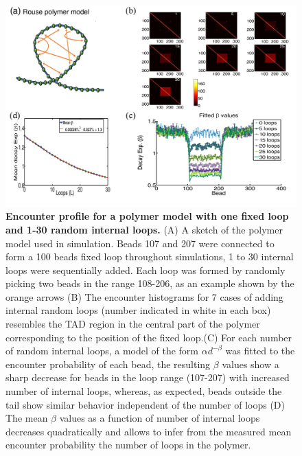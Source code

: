 \documentclass[12pt]{article}
\begin{document}
\begin{figure}[H]
\includegraphics[scale=0.7]{Figure03_OneTADWithTails0To30RandomLoops}
\caption{\textbf{Encounter profile for a polymer model with one fixed loop and 1-30 random internal loops.} (A) A sketch of the polymer model used in simulation. Beads 107 and 207 were connected to form a 100 beads fixed loop throughout simulations, 1 to 30 internal loops were sequentially added. Each loop was formed by randomly picking two beads in the range 108-206, as an example shown by the orange arrows (B) The encounter histograms for 7 cases of adding internal random loops (number indicated in white in each box) resembles the TAD region in the central part of the polymer corresponding to the position of the fixed loop.(C) For each number of random internal loops, a model of the form $\alpha d^{-\beta}$ was fitted to the encounter probability of each bead, the resulting $\beta$ values show a sharp decrease for beads in the loop range (107-207) with increased number of internal loops, whereas, as expected, beads outside the tail show similar behavior independent of the number of loops (D) The mean $\beta$ values as a function of number of internal loops decreases quadratically and allows to infer from the measured mean encounter probability the number of loops in the polymer.}
\label{figure_encounterProfileOneTADWithTails}
\end{figure}
\end{document}
